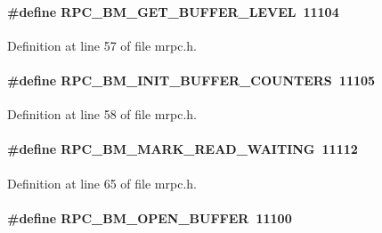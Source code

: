 \paragraph[{RPC\_\-BM\_\-GET\_\-BUFFER\_\-LEVEL}]{\setlength{\rightskip}{0pt plus 5cm}\#define RPC\_\-BM\_\-GET\_\-BUFFER\_\-LEVEL~11104}\hfill\label{group__mrpcdefineh_gab72ded79eeb603a774cabd09a05e6041}

\begin{DoxyItemize}
\item 
\end{DoxyItemize}

Definition at line 57 of file mrpc.h.
\paragraph[{RPC\_\-BM\_\-INIT\_\-BUFFER\_\-COUNTERS}]{\setlength{\rightskip}{0pt plus 5cm}\#define RPC\_\-BM\_\-INIT\_\-BUFFER\_\-COUNTERS~11105}\hfill\label{group__mrpcdefineh_gadeeb32ed05aac659594408527ebb40d0}

\begin{DoxyItemize}
\item 
\end{DoxyItemize}

Definition at line 58 of file mrpc.h.
\paragraph[{RPC\_\-BM\_\-MARK\_\-READ\_\-WAITING}]{\setlength{\rightskip}{0pt plus 5cm}\#define RPC\_\-BM\_\-MARK\_\-READ\_\-WAITING~11112}\hfill\label{group__mrpcdefineh_ga1990e62135e38d4070c1eb69cbf7a291}

\begin{DoxyItemize}
\item 
\end{DoxyItemize}

Definition at line 65 of file mrpc.h.
\paragraph[{RPC\_\-BM\_\-OPEN\_\-BUFFER}]{\setlength{\rightskip}{0pt plus 5cm}\#define RPC\_\-BM\_\-OPEN\_\-BUFFER~11100}\hfill\label{group__mrpcdefineh_gabb4377471c0fcc7fc12c20be2a8936a2}

